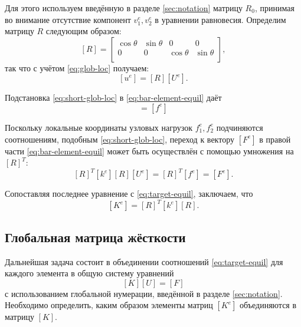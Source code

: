 \documentclass[10pt]{article}
\numberwithin{equation}{section}
\newcommand{\matr}[1]{[#1]}
\begin{document}
Для этого используем введённую в разделе \ref{sec:notation} матрицу
$R_0$, принимая во внимание отсутствие компонент $v_1^e, v_2^e$ в
уравнении равновесия. Определим матрицу $R$ следующим образом:
\begin{equation}
  \label{eq:short-rotmatrix}
  \matr{R} =
  \begin{bmatrix}
    \cos\theta & \sin\theta & 0 & 0 \\
    0 & 0 & \cos\theta & \sin\theta \\
  \end{bmatrix},
\end{equation}
так что с учётом \eqref{eq:glob-loc} получаем:
\begin{equation}
  \label{eq:short-glob-loc}
  \matr{u^e} = \matr{R}\matr{U^e}.
\end{equation}

Подстановка \eqref{eq:short-glob-loc} в \eqref{eq:bar-element-equil} даёт
\begin{equation*}
  \matr{k^e}\matr{R}\matr{U^e}=\matr{f^e}
\end{equation*}

Поскольку локальные координаты узловых нагрузок $f_1^e, f_2^e$
подчиняются соотношениям, подобным \eqref{eq:short-glob-loc}, переход
к вектору $\matr{F^e}$ в правой части \eqref{eq:bar-element-equil}
может быть осуществлён с помощью умножения на $\matr{R}^T$:
\begin{equation}
  \label{eq:bar-global-equil}
  \matr{R}^T\matr{k^e}\matr{R}\matr{U^e}=\matr{R}^T\matr{f^e} = \matr{F^e}.
\end{equation}

Сопоставляя последнее уравнение с \eqref{eq:target-equil}, заключаем,
что
\begin{equation}
  \label{eq:bar-global-stiffness}
  \matr{K^e} = \matr{R}^T\matr{k^e}\matr{R}.
\end{equation}

\subsection{Глобальная матрица жёсткости}

Дальнейшая задача состоит в объединении соотношений
\eqref{eq:target-equil} для каждого элемента в общую систему уравнений
\begin{equation}
  \label{eq:general-system}
  \matr{K}\matr{U}=\matr{F}
\end{equation}
с использованием глобальной нумерации, введённой в разделе
\ref{sec:notation}. Необходимо определить, каким образом элементы
матриц $\matr{K^e}$ объединяются в матрицу $\matr{K}$.
\end{document}
